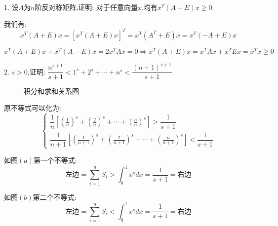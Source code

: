 1. 设$A$为$n$阶反对称矩阵,证明: 对于任意向量$x$,均有$x^{T}(A+E)x\geq 0$.
\begin{solution}
	
	我们有: $$x^{T}(A+E)x=[x^{T}(A+E)x]^T=x^{T}(A^{T}+E)x=x^{T}(-A+E)x$$
	
	$$x^{T}(A+E)x+x^{T}(A-E)x=2x^{T}Ax=0\Rightarrow x^{T}(A+E)x=x^{T}Ax+x^{T}Ex=x^{T}x\geq 0$$
\end{solution}

2. $s>0$,证明: $\dfrac{n^{s+1}}{s+1}<1^s+2^s+\cdots+n^s<\dfrac{(n+1)^{s+1}}{s+1}$
\begin{figure}[H]
	\centering
	\caption{积分和求和关系图}
\end{figure} 
\begin{solution}
	
	原不等式可以化为: 
	$$\left\lbrace
	\begin{array}{l}
		\dfrac{1}{n}[(\frac{1}{n})^s+(\frac{2}{n})^s+\cdots+(\frac{n}{n})^s]>\dfrac{1}{s+1}\\
		\dfrac{1}{n+1}[(\frac{1}{n+1})^s+(\frac{2}{n+1})^s+\cdots+(\frac{n}{n+1})^s]<\dfrac{1}{s+1}
	\end{array}
	\right. $$
	
	如图$(a)$第一个不等式: 
	$$\text{左边}=\sum\limits_{i=1}^{n}S_{i}>\int_{0}^{1}x^sdx=\dfrac{1}{s+1}=\text{右边}$$
	
	如图$(b)$第二个不等式: 
	$$\text{左边}=\sum\limits_{i=1}^{n}S_{i}<\int_{0}^{1}x^sdx=\dfrac{1}{s+1}=\text{右边}$$
\end{solution}

